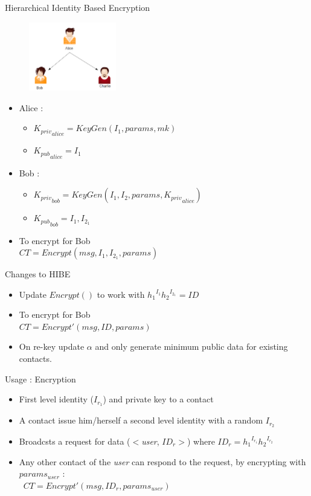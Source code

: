 \documentclass{beamer}
\begin{document}
\begin{frame}{Hierarchical Identity Based Encryption}
\begin{figure}
\includegraphics[height=3cm]{img/img3.png} 
\end{figure}

\begin{itemize}
\item Alice :
\begin{itemize}
\item ${K_{priv}}_{alice} = KeyGen(I_1, params, mk)$ 
\item ${K_{pub}}_{alice} = I_1$
\end{itemize}

\item Bob :
\begin{itemize}
\item ${K_{priv}}_{bob} = KeyGen(I_1, I_2, params, {K_{priv}}_{alice})$
\item ${K_{pub}}_{bob} = I_1, I_{2_1}$
\end{itemize}

\item To encrypt for Bob \\ $CT = Encrypt(msg, I_1, I_{2_1}, params)$


\end{itemize}
\end{frame}

\begin{frame}{Changes to HIBE}

\begin{itemize}
\item Update $Encrypt()$ to work with ${h_1}^{I_1}{h_2}^{I_{2_1}} = ID$
\item To encrypt for Bob \\ $CT = Encrypt'(msg, ID, params)$
\item On re-key update $\alpha$ and only generate minimum public data for existing contacts.
\end{itemize}
\end{frame}

\begin{frame}{Usage : Encryption}
\begin{itemize}
\item First level identity ($I_{r_1}$) and private key to a contact
\item A contact issue him/herself a second level identity with a random $I_{r_2}$
\item Broadcsts a request for data ($<$\emph{user}, $ID_r>$) where $ID_r = {h_1}^{I_{r_1}}{h_2}^{I_{r_2}}$
\item Any other contact of the \emph{user} can respond to the request, by encrypting with $params_{user}$ : \\\
$CT = Encrypt'(msg, ID_r, params_{user})$
\end{itemize}
\end{frame}
\end{document}
